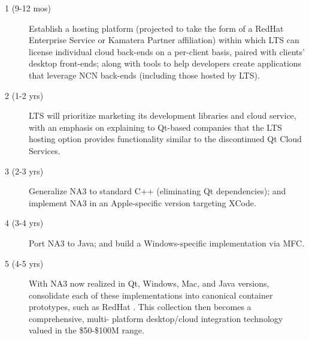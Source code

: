 \begin{frame}{}
\hspace{20pt}\begin{minipage}{.995\textwidth}
{\LARGE {}\selectfont \setlength{\leftmargini}{3pt}\begin{description}
\item[1 (9-12 mos)] Establish a hosting platform 
(projected to take the form of a 
RedHat Enterprise Service or Kamatera Partner affiliation) within which 
LTS can license individual cloud back-ends 
on a per-client basis, paired with 
clients' desktop front-ends; along with tools 
to help developers create applications 
that leverage 
NCN back-ends (including those hosted by 
LTS).
\vspace{8pt}
\item[2 (1-2 yrs)]  
LTS will prioritize marketing its development libraries 
and cloud service, 
with an emphasis on explaining to Qt-based 
companies that the LTS hosting option provides 
functionality similar to the discontinued 
Qt Cloud Services.   
\vspace{8pt}
\item[3 (2-3 yrs)] Generalize NA3 to standard 
C++ (eliminating Qt dependencies); and 
implement NA3 in an Apple-specific version 
targeting XCode.  
\vspace{8pt}
\item[4 (3-4 yrs)] Port NA3 to Java; and 
build a Windows-specific implementation 
via MFC.
\vspace{8pt}
\item[5 (4-5 yrs)] With NA3 now realized 
in Qt, Windows, Mac, and Java versions, 
consolidate each of these implementations 
into canonical container prototypes, 
such as RedHat .  This 
collection then becomes 
a comprehensive, multi- platform 
desktop/cloud integration technology 
valued in the \$50-\$100M range.
\end{description}}\end{minipage}


\end{frame}
